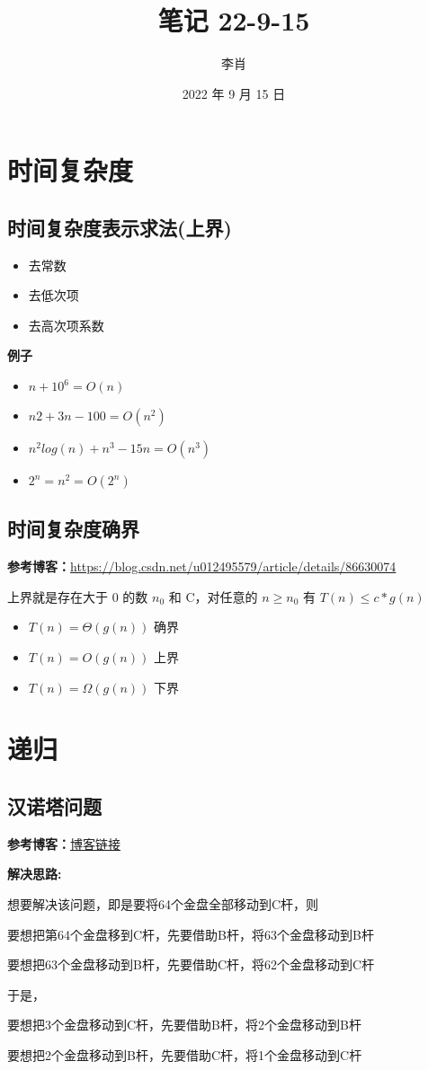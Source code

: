 \documentclass[UTF8]{ctexart}
\title{笔记 22-9-15}
\author{李肖}
\date{2022 年 9 月 15 日}
\begin{document}
\maketitle

\section{时间复杂度}

\subsection{时间复杂度表示求法(上界)}
\begin{itemize}
    \item 去常数
    \item 去低次项
    \item 去高次项系数
\end{itemize}

\textbf{例子}

\begin{itemize}
    \item $n + 10^6 = O(n)$
    \item $n2 + 3n - 100 = O(n^2)$
    \item $n^2log(n) + n^3 - 15n = O(n^3)$
    \item $2^n = n ^ 2 = O(2^n)$
\end{itemize}

\subsection{时间复杂度确界}

\textbf{参考博客：}\href{https://blog.csdn.net/u012495579/article/details/86630074}{https://blog.csdn.net/u012495579/article/details/86630074}

上界就是存在大于 0 的数 $n_0$ 和 C，对任意的 $ n \geq n_0$ 有 $T(n) \leq c*g(n)$

\begin{itemize}
    \item $T(n) = \Theta(g(n))$ 确界
    \item $T(n) = O(g(n))$ 上界
    \item $T(n) = \Omega(g(n))$ 下界
\end{itemize}

\section{递归}

\subsection{汉诺塔问题}

\textbf{参考博客：}\href{https://blog.csdn.net/weixin_66030644/article/details/124276464}{博客链接}

\textbf{解决思路:}

想要解决该问题，即是要将64个金盘全部移动到C杆，则

要想把第64个金盘移到C杆，先要借助B杆，将63个金盘移动到B杆

要想把63个金盘移动到B杆，先要借助C杆，将62个金盘移动到C杆

于是，

要想把3个金盘移动到C杆，先要借助B杆，将2个金盘移动到B杆

要想把2个金盘移动到B杆，先要借助C杆，将1个金盘移动到C杆
\end{document}
